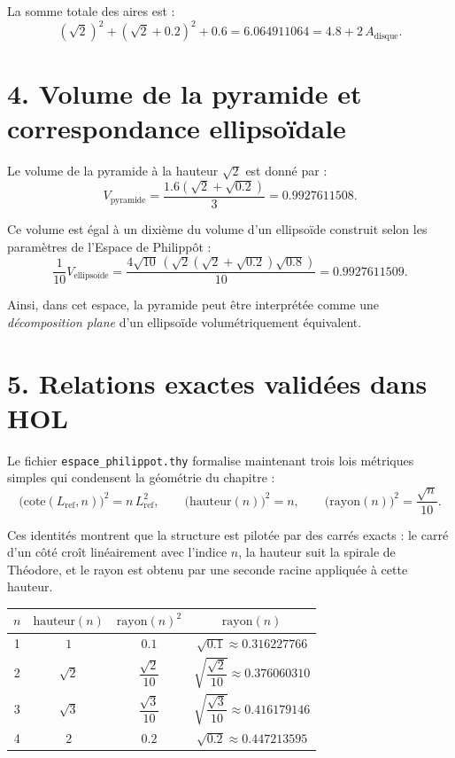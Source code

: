 \documentclass[12pt]{article}
\begin{document}
La somme totale des aires est :
\[
(\sqrt{2})^2 + (\sqrt{2} + 0.2)^2 + 0.6
= 6.064911064
= 4.8 + 2\,A_{\text{disque}}.
\]

\section*{4. Volume de la pyramide et correspondance ellipsoïdale}

Le volume de la pyramide à la hauteur $\sqrt{2}$ est donné par :
\[
V_{\text{pyramide}} = \frac{1.6 \left( \sqrt{2} + \sqrt{0.2} \right)}{3}
= 0.9927611508.
\]

Ce volume est égal à un dixième du volume d’un ellipsoïde construit selon les paramètres de l’Espace de Philippôt :
\[
\frac{1}{10} V_{\text{ellipsoïde}}
= \frac{4\sqrt{10}\,\left( \sqrt{2}(\sqrt{2}+\sqrt{0.2})\sqrt{0.8} \right)}{10}
= 0.9927611509.
\]

Ainsi, dans cet espace, la pyramide peut être interprétée comme une \emph{décomposition plane} d’un ellipsoïde volumétriquement équivalent.

\section*{5. Relations exactes validées dans HOL}

Le fichier \texttt{espace\_philippot.thy} formalise maintenant trois lois métriques
simples qui condensent la géométrie du chapitre :
\[
\bigl(\mathrm{cote}(L_{\mathrm{ref}},n)\bigr)^2 = n\,L_{\mathrm{ref}}^2,
\qquad
\bigl(\mathrm{hauteur}(n)\bigr)^2 = n,
\qquad
\bigl(\mathrm{rayon}(n)\bigr)^2 = \frac{\sqrt{n}}{10}.
\]

Ces identités montrent que la structure est pilotée par des carrés exacts :
le carré d’un côté croît linéairement avec l’indice $n$, la hauteur suit la
spirale de Théodore, et le rayon est obtenu par une seconde racine appliquée
à cette hauteur.

\begin{center}
\begin{tabular}{|c|c|c|c|}
\hline
$n$ & $\mathrm{hauteur}(n)$ & $\mathrm{rayon}(n)^2$ & $\mathrm{rayon}(n)$ \\
\hline
1 & $1$ & $0.1$ & $\sqrt{0.1} \approx 0.316227766$ \\
2 & $\sqrt{2}$ & $\dfrac{\sqrt{2}}{10}$ & $\sqrt{\dfrac{\sqrt{2}}{10}} \approx 0.376060310$ \\
3 & $\sqrt{3}$ & $\dfrac{\sqrt{3}}{10}$ & $\sqrt{\dfrac{\sqrt{3}}{10}} \approx 0.416179146$ \\
4 & $2$ & $0.2$ & $\sqrt{0.2} \approx 0.447213595$ \\
\hline
\end{tabular}
\end{center}
\end{document}
